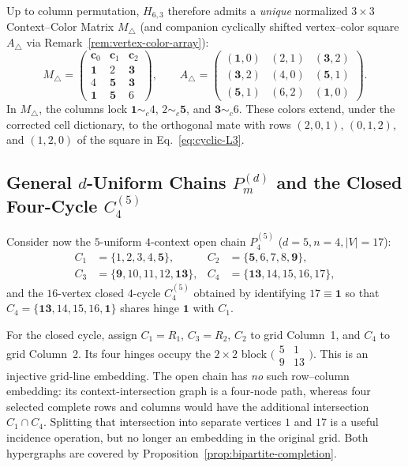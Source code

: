 \documentclass[aps,pra,reprint,superscriptaddress,longbibliography,nofootinbib,floatfix,10pt]{revtex4-2}
\theoremstyle{definition}\newtheorem{definition}[theorem]{Definition}
\theoremstyle{remark}\newtheorem{remark}[theorem]{Remark}
\begin{document}
Up to column permutation, $H_{6,3}$ therefore admits a \emph{unique} normalized $3\times 3$ Context--Color Matrix $M_{\triangle}$ (and companion cyclically shifted vertex--color square $A_{\triangle}$ via Remark~\ref{rem:vertex-color-array}):
\begin{equation}\label{eq:triangle-matrix}
M_{\triangle}=\begin{pmatrix}
\mathbf{c}_0 & \mathbf{c}_1 & \mathbf{c}_2\\\hline
\mathbf{1} & 2 & \mathbf{3}\\
4 & \mathbf{5} & \mathbf{3}\\
\mathbf{1} & \mathbf{5} & 6
\end{pmatrix},\qquad
A_{\triangle}=\begin{pmatrix}
(\mathbf{1},0) & (2,1) & (\mathbf{3},2)\\
(\mathbf{3},2) & (4,0) & (\mathbf{5},1)\\
(\mathbf{5},1) & (6,2) & (\mathbf{1},0)
\end{pmatrix}.
\end{equation}
In $M_{\triangle}$, the columns lock $\mathbf{1}\sim_c 4$, $2\sim_c\mathbf{5}$, and $\mathbf{3}\sim_c 6$. These colors extend, under the corrected cell dictionary, to the orthogonal mate with rows $(2,0,1)$, $(0,1,2)$, and $(1,2,0)$ of the square in Eq.~\eqref{eq:cyclic-L3}.

\subsection{General \texorpdfstring{$d$}{d}-Uniform Chains \texorpdfstring{$P_m^{(d)}$}{Pm(d)} and the Closed Four-Cycle \texorpdfstring{$C_4^{(5)}$}{C4(5)}}\label{sec:chains-cycles}

Consider now the $5$-uniform $4$-context open chain $P_4^{(5)}$ ($d=5,n=4,|V|=17$):
\begin{equation}\label{eq:P4-5}
\begin{aligned}
C_1&=\{1,2,3,4,\mathbf{5}\},& C_2&=\{\mathbf{5},6,7,8,\mathbf{9}\},\\
C_3&=\{\mathbf{9},10,11,12,\mathbf{13}\},& C_4&=\{\mathbf{13},14,15,16,17\},
\end{aligned}
\end{equation}
and the $16$-vertex closed $4$-cycle $C_4^{(5)}$ obtained by identifying $17\equiv\mathbf{1}$ so that $C_4=\{\mathbf{13},14,15,16,\mathbf{1}\}$ shares hinge $\mathbf{1}$ with $C_1$.

For the closed cycle, assign $C_1=R_1$, $C_3=R_2$, $C_2$ to grid Column~1, and $C_4$ to grid Column~2. Its four hinges occupy the $2\times2$ block $\bigl(\begin{smallmatrix}5&1\\9&13\end{smallmatrix}\bigr)$. This is an injective grid-line embedding. The open chain has \emph{no} such row--column embedding: its context-intersection graph is a four-node path, whereas four selected complete rows and columns would have the additional intersection $C_1\cap C_4$. Splitting that intersection into separate vertices $1$ and $17$ is a useful incidence operation, but no longer an embedding in the original grid. Both hypergraphs are covered by Proposition~\ref{prop:bipartite-completion}.
\end{document}
